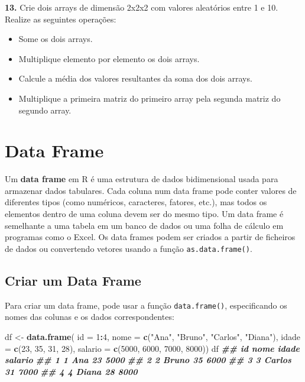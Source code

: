 \documentclass[
]{book}
\newenvironment{Shaded}{\begin{snugshade}}{\end{snugshade}}
\newcommand{\AttributeTok}[1]{\textcolor[rgb]{0.13,0.29,0.53}{#1}}
\newcommand{\DecValTok}[1]{\textcolor[rgb]{0.00,0.00,0.81}{#1}}
\newcommand{\DocumentationTok}[1]{\textcolor[rgb]{0.56,0.35,0.01}{\textbf{\textit{#1}}}}
\newcommand{\FunctionTok}[1]{\textcolor[rgb]{0.13,0.29,0.53}{\textbf{#1}}}
\newcommand{\NormalTok}[1]{#1}
\newcommand{\OtherTok}[1]{\textcolor[rgb]{0.56,0.35,0.01}{#1}}
\newcommand{\SpecialCharTok}[1]{\textcolor[rgb]{0.81,0.36,0.00}{\textbf{#1}}}
\newcommand{\StringTok}[1]{\textcolor[rgb]{0.31,0.60,0.02}{#1}}
\providecommand{\tightlist}{%
  \setlength{\itemsep}{0pt}\setlength{\parskip}{0pt}}
\begin{document}
\textbf{13.} Crie dois arrays de dimensão 2x2x2 com valores aleatórios entre
1 e 10. Realize as seguintes operações:

\begin{itemize}
\tightlist
\item
  Some os dois arrays.
\item
  Multiplique elemento por elemento os dois arrays.
\item
  Calcule a média dos valores resultantes da soma dos dois arrays.
\item
  Multiplique a primeira matriz do primeiro array pela segunda matriz
  do segundo array.
\end{itemize}

\section{Data Frame}\label{data-frame}

Um \textbf{data frame} em R é uma estrutura de dados bidimensional usada para
armazenar dados tabulares. Cada coluna num data frame pode conter
valores de diferentes tipos (como numéricos, caracteres, fatores, etc.),
mas todos os elementos dentro de uma coluna devem ser do mesmo tipo. Um
data frame é semelhante a uma tabela em um banco de dados ou uma folha
de cálculo em programas como o Excel. Os data frames podem ser criados a
partir de ficheiros de dados ou convertendo vetores usando a função
\texttt{as.data.frame()}.

\subsection{Criar um Data Frame}\label{criar-um-data-frame}

Para criar um data frame, pode usar a função \texttt{data.frame()},
especificando os nomes das colunas e os dados correspondentes:

\begin{Shaded}
\begin{Highlighting}[]
\NormalTok{df }\OtherTok{\textless{}{-}} \FunctionTok{data.frame}\NormalTok{(}
\AttributeTok{id =} \DecValTok{1}\SpecialCharTok{:}\DecValTok{4}\NormalTok{,}
\AttributeTok{nome =} \FunctionTok{c}\NormalTok{(}\StringTok{"Ana"}\NormalTok{, }\StringTok{"Bruno"}\NormalTok{, }\StringTok{"Carlos"}\NormalTok{, }\StringTok{"Diana"}\NormalTok{),}
\AttributeTok{idade =} \FunctionTok{c}\NormalTok{(}\DecValTok{23}\NormalTok{, }\DecValTok{35}\NormalTok{, }\DecValTok{31}\NormalTok{, }\DecValTok{28}\NormalTok{),}
\AttributeTok{salario =} \FunctionTok{c}\NormalTok{(}\DecValTok{5000}\NormalTok{, }\DecValTok{6000}\NormalTok{, }\DecValTok{7000}\NormalTok{, }\DecValTok{8000}\NormalTok{))}
\NormalTok{df}
\DocumentationTok{\#\#   id   nome idade salario}
\DocumentationTok{\#\# 1  1    Ana    23    5000}
\DocumentationTok{\#\# 2  2  Bruno    35    6000}
\DocumentationTok{\#\# 3  3 Carlos    31    7000}
\DocumentationTok{\#\# 4  4  Diana    28    8000}
\end{Highlighting}
\end{Shaded}
\end{document}
